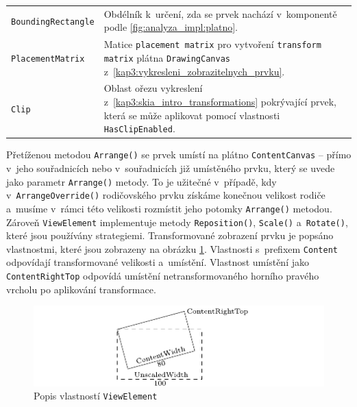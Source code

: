 \hskip-1.0cm\renewcommand{}
\begin{tabular}{ m{} m{} }
\texttt{BoundingRectangle} & Obdélník k~určení, zda se prvek nachází v~komponentě podle \ref{fig:analyza_impl:platno}. \\
\texttt{PlacementMatrix} & Matice \texttt{placement matrix} pro vytvoření \texttt{transform matrix} plátna \texttt{DrawingCanvas} z~\ref{kap3:vykresleni_zobrazitelnych_prvku}. \\
\texttt{Clip} & Oblast ořezu vykreslení z~\ref{kap3:skia_intro_transformations} pokrývající prvek, která se může aplikovat pomocí vlastnosti \texttt{HasClipEnabled}. \\ 
\end{tabular}
\newline
\newline
Přetíženou metodou \texttt{Arrange()} se prvek umístí na plátno \texttt{ContentCanvas} -- přímo v~jeho souřadnicích nebo v~souřadnicích již umístěného prvku, který se uvede jako parametr \texttt{Arrange()} metody. To je užitečné v~případě, kdy \linebreak v~\texttt{ArrangeOverride()} rodičovského prvku získáme konečnou velikost rodiče \linebreak a~musíme v~rámci této velikosti rozmístit jeho potomky \texttt{Arrange()} metodou. Zároveň \texttt{ViewElement} implementuje metody \texttt{Reposition()}, \texttt{Scale()} a~\texttt{Rotate()}, které jsou používány strategiemi. Transformované zobrazení prvku je popsáno vlastnostmi, které jsou zobrazeny na obrázku \ref{fig:kap4:gttg-view-element-properties}. Vlastnosti s~prefixem \texttt{Content} odpovídají transformované velikosti a~umístění. Vlastnost umístění jako \linebreak\texttt{ContentRightTop} odpovídá umístění netransformovaného horního pravého vrcholu po aplikování transformace.

\begin{figure}[!hbt]
	\centering
	\includegraphics[width=\textwidth]{../img/kap4_gtttg-core-element-transform-properties}
	\caption{Popis vlastností \texttt{ViewElement}}
	\label{fig:kap4:gttg-view-element-properties}
\end{figure}

